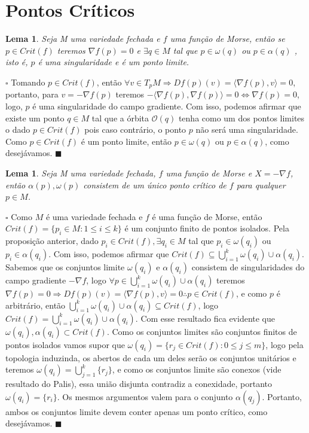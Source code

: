 \documentclass[12pt]{book}
\newtheorem{lema}[teorema]{Lema}
\newenvironment{prova}[1]{$\square$ #1}{\hfill$\blacksquare$}
\newcommand{\produtointerno}[2]{\langle #1, #2 \rangle}
\begin{document}
	\section{Pontos Críticos}
	\begin{lema}
		Seja M uma variedade fechada e $f$ uma função de Morse, então se $p \in Crit(f)$ teremos $\nabla f(p)=0$ e $\exists q \in M$ tal que $p \in \omega(q)$ ou $p \in \alpha(q)$ , isto é, $p$ é uma singularidade e é um ponto limite.
	\end{lema}
	\begin{prova}
		Tomando $p \in Crit(f)$, então $\forall v \in T_{p}M \Rightarrow Df(p)(v) = \produtointerno{\nabla f(p)}{v} = 0$, portanto, para $v = -\nabla f(p)$ teremos $-\produtointerno{\nabla f(p)}{\nabla f(p)} = 0 \iff \nabla f(p) = 0$, logo, $p$ é uma singularidade do campo gradiente. Com isso, podemos afirmar que existe um ponto $q \in M$ tal que a órbita $\mathcal{O}(q)$ tenha como um dos pontos limites o dado $p \in Crit(f)$ pois caso contrário, o ponto $p$ não será uma singularidade. Como $p \in Crit(f)$ é um ponto limite, então $p \in \omega(q)$ ou $p \in \alpha(q)$, como desejávamos.
	\end{prova}
	
	\begin{lema}
		Seja M uma variedade fechada, $f$ uma função de Morse e $X =-\nabla f$, então $\alpha(p), \omega(p)$ consistem de um único ponto crítico de $f$ para qualquer $p \in M$.
	\end{lema}
	\begin{prova}
		Como $M$ é uma variedade fechada e $f$ é uma função de Morse, então $Crit(f) = \{p_{i} \in M: 1\leq i \leq k \}$ é um conjunto finito de pontos isolados. Pela proposição anterior, dado $p_{i} \in Crit(f), \exists q_{i} \in M$ tal que $p_{i} \in \omega(q_{i})$ ou $p_{i} \in \alpha(q_{i})$. Com isso, podemos afirmar que $Crit(f) \subseteq \bigcup_{i=1}^{k}\omega(q_{i}) \cup \alpha(q_{i})$. Sabemos que os conjuntos limite $\omega(q_{i})$ e $\alpha(q_{i})$ consistem de singularidades do campo gradiente $-\nabla f$, logo $\forall p \in \bigcup_{i=1}^{k}\omega(q_{i}) \cup \alpha(q_{i})$ teremos $\nabla f(p) = 0 \Rightarrow Df(p)(v) = \produtointerno{\nabla f(p)}{v} = 0 \therefore p \in Crit(f)$, e como $p$ é arbitrário, então $\bigcup_{i=1}^{k}\omega(q_{i}) \cup \alpha(q_{i}) \subseteq Crit(f)$, logo $Crit(f) = \bigcup_{i=1}^{k}\omega(q_{i}) \cup \alpha(q_{i})$. Com esse resultado fica evidente que $\omega(q_{i}), \alpha(q_{i}) \subset Crit(f)$. Como os conjuntos limites são conjuntos finitos de pontos isolados vamos supor que $\omega(q_{i}) = \{r_{j} \in Crit(f): 0\leq j \leq m\}$, logo pela topologia induzinda, os abertos de cada um deles serão os conjuntos unitários e teremos $\omega(q_{i}) = \bigcup_{j=1}^{k} \{r_{j}\} $, e como os conjuntos limite são conexos (vide resultado do Palis), essa união disjunta contradiz a conexidade, portanto $\omega(q_{i}) = \{r_{i}\}$. Os mesmos argumentos valem para o conjunto $\alpha(q_{j})$. Portanto, ambos os conjuntos limite devem conter apenas um ponto crítico, como desejávamos.
	\end{prova}
	
\end{document}
